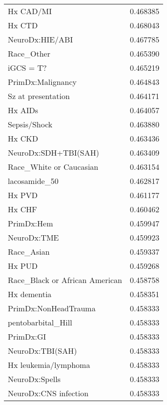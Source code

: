 \begin{tabular}{lr}
Hx CAD/MI                      &  0.468385 \\
Hx CTD                         &  0.468043 \\
NeuroDx:HIE/ABI                &  0.467785 \\
Race\_Other                     &  0.465390 \\
iGCS = T?                      &  0.465219 \\
PrimDx:Malignancy              &  0.464843 \\
Sz at presentation             &  0.464171 \\
Hx AIDs                        &  0.464057 \\
Sepsis/Shock                   &  0.463880 \\
Hx CKD                         &  0.463436 \\
NeuroDx:SDH+TBI(SAH)           &  0.463409 \\
Race\_White or Caucasian        &  0.463154 \\
lacosamide\_50                  &  0.462817 \\
Hx PVD                         &  0.461177 \\
Hx CHF                         &  0.460462 \\
PrimDx:Hem                     &  0.459947 \\
NeuroDx:TME                    &  0.459923 \\
Race\_Asian                     &  0.459337 \\
Hx PUD                         &  0.459268 \\
Race\_Black or African American &  0.458758 \\
Hx dementia                    &  0.458351 \\
PrimDx:NonHeadTrauma           &  0.458333 \\
pentobarbital\_Hill             &  0.458333 \\
PrimDx:GI                      &  0.458333 \\
NeuroDx:TBI(SAH)               &  0.458333 \\
Hx leukemia/lymphoma           &  0.458333 \\
NeuroDx:Spells                 &  0.458333 \\
NeuroDx:CNS infection          &  0.458333 \\
\bottomrule
\end{tabular}
